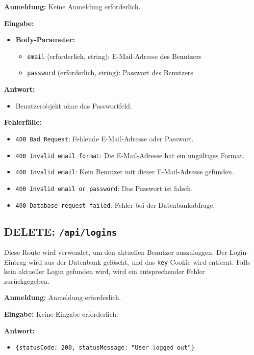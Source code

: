 \documentclass[a4paper,12pt]{article}
\begin{document}
\textbf{Anmeldung:} Keine Anmeldung erforderlich.

\textbf{Eingabe:}
\begin{itemize}
    \item \textbf{Body-Parameter:}
    \begin{itemize}
        \item \texttt{email} (erforderlich, string):
            E-Mail-Adresse des Benutzers
        \item \texttt{password} (erforderlich, string):
            Passwort des Benutzers
    \end{itemize}
\end{itemize}

\textbf{Antwort:}
\begin{itemize}
    \item Benutzerobjekt ohne das Passwortfeld.
\end{itemize}

\textbf{Fehlerfälle:}
\begin{itemize}
    \item \texttt{400 Bad Request}:
        Fehlende E-Mail-Adresse oder Passwort.
    \item \texttt{400 Invalid email format}:
        Die E-Mail-Adresse hat ein ungültiges Format.
    \item \texttt{400 Invalid email}:
        Kein Benutzer mit dieser E-Mail-Adresse gefunden.
    \item \texttt{400 Invalid email or password}:
        Das Passwort ist falsch.
    \item \texttt{400 Database request failed}:
        Fehler bei der Datenbankabfrage.
\end{itemize}

\newpage
\subsection{DELETE: \texttt{/api/logins}}

Diese Route wird verwendet, um den aktuellen Benutzer auszuloggen. Der
Login-Eintrag wird aus der Datenbank gelöscht, und das \texttt{key}-Cookie wird
entfernt. Falls kein aktueller Login gefunden wird, wird ein entsprechender
Fehler zurückgegeben.

\textbf{Anmeldung:} Anmeldung erforderlich.

\textbf{Eingabe:} Keine Eingabe erforderlich.

\textbf{Antwort:}
\begin{itemize}
    \item \texttt{\{statusCode: 200,
        statusMessage: "User logged out"\}}
\end{itemize}
\end{document}
